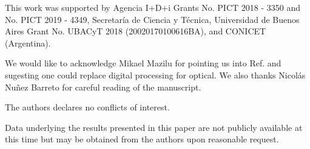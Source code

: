 \documentclass{optica-article}
\begin{document}
\newpage

\begin{backmatter}
This work was supported by Agencia I+D+i Grants No. PICT 2018 - 3350 and No. PICT 2019 - 4349, Secretaría de Ciencia y Técnica, Universidad de Buenos Aires Grant No. UBACyT 2018 (20020170100616BA), and CONICET (Argentina). 

We would like to acknowledge Mikael Mazilu for pointing us into Ref. \cite{metzger2017harnessing} and sugesting one could replace digital processing for optical. We also thanks Nicolás Nuñez Barreto for careful reading of the manuscript.

The authors declares no conflicts of interest.

 Data underlying the results presented in this paper are not publicly available at this time but may be obtained from the authors upon reasonable request.


\end{backmatter}









\end{document}
